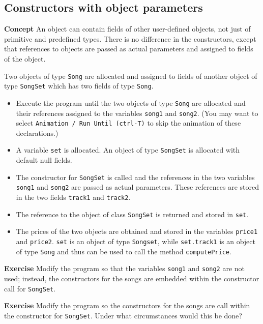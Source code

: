 \subsection{Constructors with object parameters}\label{con.07}

\textbf{Concept} An object can contain fields of other user-defined 
objects, not just of primitive and predefined types. There is no 
difference in the constructors, except that references to objects are
passed as actual parameters and assigned to fields of the object.


Two objects of type \texttt{Song} are allocated and 
assigned to fields of another object of type 
\texttt{SongSet} which has two fields of type \texttt{Song}.
\begin{itemize}
\item Execute the program until the two objects of type \texttt{Song} are 
allocated and their references assigned to the variables \texttt{song1} and \texttt{song2}.
(You may want to select \texttt{Animation / Run Until (ctrl-T)} to skip the 
animation of these declarations.)
\item A variable \texttt{set} is allocated. An object of type 
\texttt{SongSet} is allocated with default null fields.
\item The constructor for \texttt{SongSet} is called and the references in the two variables
\texttt{song1} and \texttt{song2} are passed as actual parameters. These references 
are stored in the two fields \texttt{track1} and \texttt{track2}.
\item The reference to the object of class \texttt{SongSet} 
is returned and stored in \texttt{set}. 
\item The prices of the two objects are obtained and stored in the variables
\texttt{price1} and \texttt{price2}. \texttt{set} is an object 
of type \texttt{Songset}, while \texttt{set.track1} is an object of type 
\texttt{Song} and thus can be used to call the method 
\texttt{computePrice}.
\end{itemize}

\textbf{Exercise}  Modify the program so that the variables \texttt{song1} and
\texttt{song2} are not used; instead, the constructors for the songs are
embedded within the constructor call for \texttt{SongSet}.

\textbf{Exercise}  Modify the program so the constructors for the songs are
call within the constructor for \texttt{SongSet}. Under what circumstances
would this be done?
